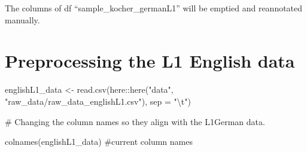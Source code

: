 \documentclass[
  letterpaper,
  DIV=11,
  numbers=noendperiod]{scrartcl}
\newenvironment{Shaded}{\begin{snugshade}}{\end{snugshade}}
\newcommand{\AttributeTok}[1]{\textcolor[rgb]{0.40,0.45,0.13}{#1}}
\newcommand{\CommentTok}[1]{\textcolor[rgb]{0.37,0.37,0.37}{#1}}
\newcommand{\FunctionTok}[1]{\textcolor[rgb]{0.28,0.35,0.67}{#1}}
\newcommand{\NormalTok}[1]{\textcolor[rgb]{0.00,0.23,0.31}{#1}}
\newcommand{\OtherTok}[1]{\textcolor[rgb]{0.00,0.23,0.31}{#1}}
\newcommand{\SpecialCharTok}[1]{\textcolor[rgb]{0.37,0.37,0.37}{#1}}
\newcommand{\StringTok}[1]{\textcolor[rgb]{0.13,0.47,0.30}{#1}}
\begin{document}
The columns of df ``sample\_kocher\_germanL1'' will be emptied and
reannotated manually.

\section{Preprocessing the L1 English
data}\label{preprocessing-the-l1-english-data}

\begin{Shaded}
\begin{Highlighting}[]
\NormalTok{englishL1\_data }\OtherTok{\textless{}{-}} \FunctionTok{read.csv}\NormalTok{(here}\SpecialCharTok{::}\FunctionTok{here}\NormalTok{(}\StringTok{"data"}\NormalTok{, }\StringTok{"raw\_data/raw\_data\_englishL1.csv"}\NormalTok{), }\AttributeTok{sep =} \StringTok{"}\SpecialCharTok{\textbackslash{}t}\StringTok{"}\NormalTok{)}

\CommentTok{\# Changing the column names so they align with the L1German data.}

\FunctionTok{colnames}\NormalTok{(englishL1\_data) }\CommentTok{\#current column names}
\end{Highlighting}
\end{Shaded}
\end{document}
